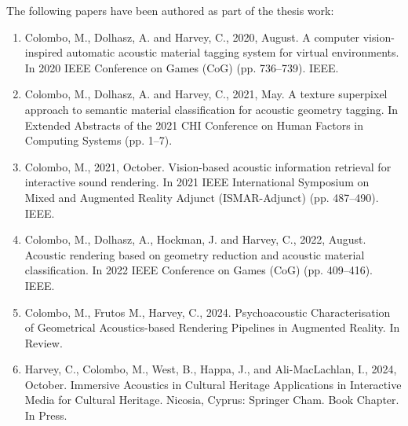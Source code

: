 The following papers have been authored as part of the thesis work:

\begin{enumerate}
    \item Colombo, M., Dolhasz, A. and Harvey, C., 2020, August. A computer vision-inspired automatic acoustic material tagging system for virtual environments. In 2020 IEEE Conference on Games (CoG) (pp. 736--739). IEEE.
    \item Colombo, M., Dolhasz, A. and Harvey, C., 2021, May. A texture superpixel approach to semantic material classification for acoustic geometry tagging. In Extended Abstracts of the 2021 CHI Conference on Human Factors in Computing Systems (pp. 1--7).
    \item Colombo, M., 2021, October. Vision-based acoustic information retrieval for interactive sound rendering. In 2021 IEEE International Symposium on Mixed and Augmented Reality Adjunct (ISMAR-Adjunct) (pp. 487--490). IEEE.
    \item Colombo, M., Dolhasz, A., Hockman, J. and Harvey, C., 2022, August. Acoustic rendering based on geometry reduction and acoustic material classification. In 2022 IEEE Conference on Games (CoG) (pp. 409--416). IEEE.
    \item Colombo, M., Frutos M., Harvey, C., 2024. Psychoacoustic Characterisation of Geometrical Acoustics-based Rendering Pipelines in Augmented Reality. In Review.
    \item Harvey, C., Colombo, M., West, B., Happa, J., and Ali-MacLachlan, I., 2024, October. Immersive Acoustics in Cultural Heritage Applications in Interactive Media for Cultural Heritage. Nicosia, Cyprus: Springer Cham. Book Chapter. In Press.
\end{enumerate}


